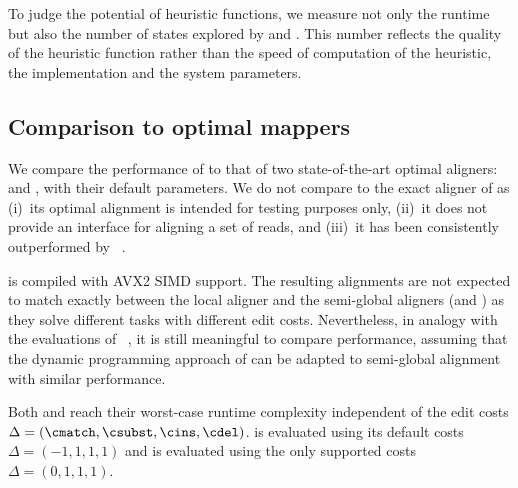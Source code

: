 To judge the potential of heuristic functions, we measure not only the runtime
but also the number of states explored by \astarix and \dijkstra. This number
reflects the quality of the heuristic function rather than the speed of
computation of the heuristic, the implementation and the system parameters.

\subsection{Comparison to optimal mappers}

We compare the performance of \astarix to that of two state-of-the-art optimal
aligners: \pasgal and \bitparallel, with their default parameters.
%
We do not compare to the exact aligner of \vg as (i)~its optimal alignment
is intended for testing purposes only, (ii)~it does not provide an
interface for aligning a set of reads, and (iii)~it has been consistently
outperformed by \pasgal~\cite{jain_accelerating_2019}.

\pasgal is compiled with AVX2 SIMD support. The resulting alignments are not
expected to match exactly between the local aligner \pasgal and the semi-global
aligners (\astarix and \bitparallel) as they solve different tasks with
different edit costs. Nevertheless, in analogy with the evaluations of
\pasgal~\cite{jain_accelerating_2019}, it is still meaningful to compare
performance, assuming that the dynamic programming approach of \pasgal can be
adapted to semi-global alignment with similar performance.

Both \bitparallel and \pasgal reach their worst-case runtime complexity
independent of the edit costs $\Delta=(\cmatch,\csubst,\cins,\cdel)$. \pasgal is
evaluated using its default costs ~$\Delta=(-1,1,1,1)$ and \bitparallel is
evaluated using the only supported costs~$\Delta=(0,1,1,1)$.